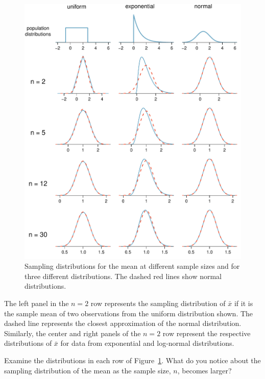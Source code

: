\begin{figure}
   \centering
   \includegraphics[width=\textwidth]{ch_distributions/figures/cltSimulations/cltSimulations}
   \caption{Sampling distributions for the mean at different sample sizes and for three different distributions. The dashed red lines show normal distributions.}
   \label{cltSimulations}
\end{figure}

The left panel in the $n=2$ row represents the sampling distribution of $\bar{x}$ if it is the sample mean of two observations from the uniform distribution shown. The dashed line represents the closest approximation of the normal distribution. Similarly, the center and right panels of the $n=2$ row represent the respective distributions of $\bar{x}$ for data from exponential and log-normal distributions.

\begin{exercisewrap}
\begin{nexercise}
Examine the distributions in each row of Figure~\ref{cltSimulations}. What do you notice about the sampling distribution of the mean as the sample size, $n$, becomes larger?\footnotemark
\end{nexercise}
\end{exercisewrap}


